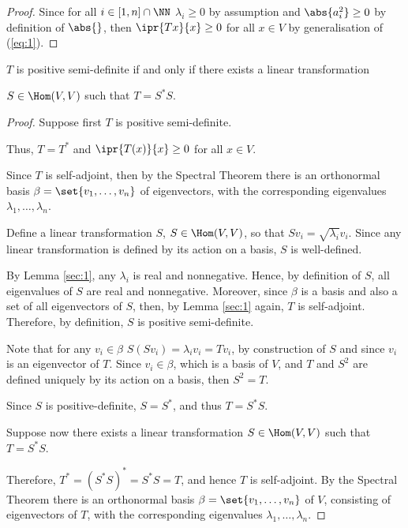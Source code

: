 \documentclass[11pt]{scrartcl}
\begin{document}
\begin{proof}
  Since for all $i\in [1, n]\cap\NN$ $\lambda_i \geq 0$ by assumption and $\abs{a^2_i} \geq 0$ by definition of $\abs{\*}$, then $\ipr{Tx}{x}\geq 0$ for all $x\in V$ by generalisation of (\ref{eq:1}).
\end{proof}

\begin{lemma}
  \label{sec:2}
  $T$ is positive semi-definite if and only if there exists a linear transformation

  $S \in \Hom(V,V)$ such that $T=S^{*}S$.
\end{lemma}

\begin{proof}
  \hfill

  Suppose first $T$ is positive semi-definite.

  Thus, $T = T^{*}$ and $\ipr{T(x)}{x}\geq0$ for all $x\in V$.

  Since $T$ is self-adjoint, then by the Spectral Theorem there is an
  orthonormal basis $\beta = \set{v_1, \dots, v_n}$ of eigenvectors,
  with the corresponding eigenvalues $\lambda_1, \dots, \lambda_n$.

  Define a linear transformation $S$, $S \in \Hom(V,V)$, so that
  $Sv_i = \sqrt{\lambda_i}v_i$. Since any linear transformation is
  defined by its action on a basis, $S$ is well-defined.

  By Lemma \ref{sec:1}, any $\lambda_i$ is real and nonnegative. Hence, by
  definition of $S$, all eigenvalues of $S$ are real and
  nonnegative. Moreover, since $\beta$ is a basis and also a set of
  all eigenvectors of $S$, then, by Lemma \ref{sec:1} again, $T$ is
  self-adjoint. Therefore, by definition, $S$ is positive semi-definite.

  Note that for any $v_i\in\beta$ $S(Sv_i) = \lambda_iv_i = Tv_i$, by
  construction of $S$ and since $v_i$ is an eigenvector of $T$. Since
  $v_i\in\beta$, which is a basis of $V$, and $T$ and $S^2$ are
  defined uniquely by its action on a basis, then $S^2 = T$.

  Since $S$ is positive-definite, $S = S^{*}$, and thus $T = S^{*}S$.

  Suppose now there exists a linear transformation
  $S \in \Hom(V,V)$ such that $T=S^{*}S$.

  Therefore, $T^{*}=(S^{*}S)^{*} = S^{*}S = T$, and hence $T$ is
  self-adjoint. By the Spectral Theorem there is an orthonormal basis
  $\beta = \set{v_1, \dots, v_n}$ of $V$, consisting of eigenvectors
  of $T$, with the corresponding eigenvalues
  $\lambda_1, \dots, \lambda_n$.


\end{proof}
\end{document}

